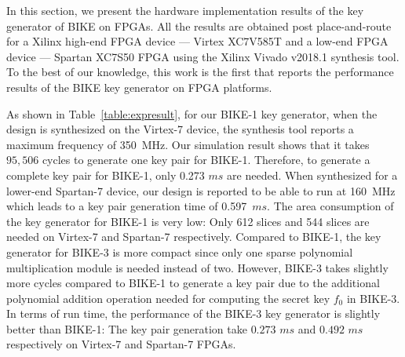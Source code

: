 \documentclass[runningheads]{llncs}
\begin{document}
%
In this section, we present the hardware implementation results of the 
key generator of BIKE on FPGAs. 
All the results are obtained post place-and-route for a 
Xilinx high-end FPGA device --- Virtex XC7V585T 
and a low-end FPGA device --- Spartan XC7S50 FPGA 
using the Xilinx Vivado v2018.1 synthesis tool.
To the best of our knowledge, this work is the first 
that reports the performance results of the BIKE key generator 
on FPGA platforms. 
 
As shown in Table~\ref{table:expresult}, 
for our BIKE-1 key generator,
when the design is synthesized on the Virtex-7 device, 
the synthesis tool reports a maximum frequency of 350~MHz. 
Our simulation result shows that it takes $95,506$ cycles 
to generate one key pair for BIKE-1.
Therefore, to generate a complete key pair for BIKE-1,
only 0.273 $ms$ are needed. 
When synthesized for a lower-end Spartan-7 device,
our design is reported to be able to run at 160~MHz 
which leads to a key pair generation time of 0.597~$ms$. 
The area consumption of the key generator
for BIKE-1 is very low: Only 612 slices and 544 slices 
are needed on Virtex-7 and Spartan-7 respectively. 
Compared to BIKE-1, the key generator for BIKE-3
is more compact since only one sparse polynomial
multiplication module is needed instead of two.
However, BIKE-3 takes slightly more cycles 
compared to BIKE-1 to generate a key pair
due to the additional polynomial addition operation
needed for computing the secret key $f_0$ 
in BIKE-3.
In terms of run time,
the performance of the BIKE-3 key generator 
is slightly better than BIKE-1: 
The key pair generation take $0.273$ $ms$ and $0.492$ $ms$ 
respectively on Virtex-7 and Spartan-7 FPGAs. 
\end{document}
